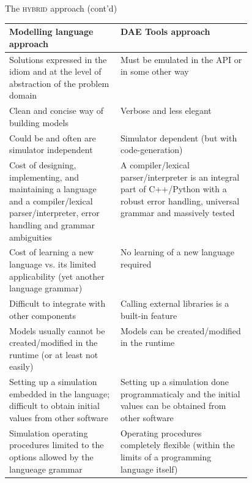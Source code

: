 \documentclass[compress,newPxFont,sthlmFooter]{beamer}
\begin{document}
\begin{frame}[plain]{The \textsc{hybrid} approach (cont'd)}
\tiny
{
\begin{table}
  \begin{tabularx}{\linewidth}{p{0.46\linewidth}X}
    \toprule
    \textcolor{sthlmRed}{\textbf{Modelling language approach}} & \textcolor{sthlmRed}{\textbf{DAE Tools approach}} \tabularnewline
    \midrule
    
    \cellcolor{light_green}Solutions expressed in the idiom and at the level of abstraction of the problem domain
      &
    \cellcolor{light_red}Must be emulated in the API or in some other way 
    \tabularnewline \midrule
    
    \cellcolor{light_green}Clean and concise way of building models
      &
    \cellcolor{light_red}Verbose and less elegant
    \tabularnewline \midrule
    
    \cellcolor{light_green}Could be and often are simulator independent
      &
    \cellcolor{light_red}Simulator dependent (but with code-generation) 
    \tabularnewline \midrule
    
    \cellcolor{light_red}Cost of designing, implementing, and maintaining a language and 
    a compiler/lexical parser/interpreter, error handling and grammar ambiguities
      &
    \cellcolor{light_green}A compiler/lexical parser/interpreter is an integral part of C++/Python with a
    robust error handling, universal grammar and massively tested 
    \tabularnewline \midrule
    
    \cellcolor{light_red}Cost of learning a new language vs. its limited applicability (yet another language grammar)
      &
    \cellcolor{light_green}No learning of a new language required
    \tabularnewline \midrule
    
    \cellcolor{light_red}Difficult to integrate with other components
      &
    \cellcolor{light_green}Calling external libraries is a built-in feature 
    \tabularnewline \midrule
    
    \cellcolor{light_red}Models usually cannot be created/modified in the runtime (or at least not easily)
      &
    \cellcolor{light_green}Models can be created/modified in the runtime 
    \tabularnewline \midrule
    
    \cellcolor{light_red}Setting up a simulation embedded in the language; difficult to obtain initial values from other software
      &
    \cellcolor{light_green}Setting up a simulation done programmaticaly and the initial values can be obtained from other software
    \tabularnewline \midrule
    
    \cellcolor{light_red}Simulation operating procedures limited to the options allowed by the langueage grammar
      &
    \cellcolor{light_green}Operating procedures completely flexible (within the limits of a programming language itself)
    \tabularnewline
    
    \bottomrule
  \end{tabularx}
\end{table}
}
\end{frame}
\end{document}
